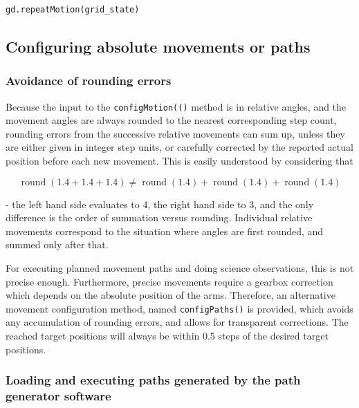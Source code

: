 \documentclass[11pt,a4paper]{report}
\DeclareMathOperator{\round}{round}
\begin{document}
\begin{verbatim}
gd.repeatMotion(grid_state)
\end{verbatim}


\subsection{Configuring absolute movements or paths}
\label{sec:configuringmovementpaths}

\subsubsection{Avoidance of rounding errors}
%
%
%
%
%
Because the input to the \texttt{configMotion(()} method is in
relative angles, and the movement angles are always rounded to the
nearest corresponding step count, rounding errors from the successive
relative movements can sum up, unless they are either given in integer
step units, or carefully corrected by the reported actual position
before each new movement. This is easily understood by considering that

\[
\round(1.4 + 1.4 + 1.4)\neq \round(1.4) + \round(1.4) + \round(1.4) 
\]

- the left hand side evaluates to 4, the right hand side to 3, and the
only difference is the order of summation versus rounding. Individual
relative movements correspond to the situation where angles are first
rounded, and summed only after that.

For executing planned movement paths and doing science observations,
this is not precise enough. Furthermore, precise movements require a
gearbox correction which depends on the absolute position of the arms.
Therefore, an alternative movement configuration method, named
\texttt{configPaths()} is provided, which avoids any accumulation of
rounding errors, and allows for transparent corrections. The reached
target positions will always be within 0.5 steps of the desired target
positions.


\subsubsection{Loading and executing paths generated by the path generator software}
\label{sec:loadingpaths}
%
%
%
%
%
%
%
%
%
%
\end{document}

